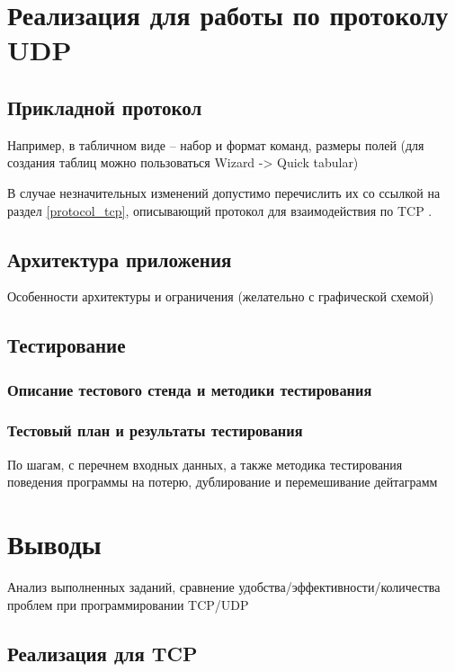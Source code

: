 \documentclass[12pt,a4paper]{report}
\begin{document}
\chapter{Реализация для работы по протоколу UDP}
\section{Прикладной протокол}

Например, в табличном виде -- набор и формат команд, размеры полей
(для создания таблиц можно пользоваться Wizard -> Quick tabular)




В случае незначительных изменений допустимо перечислить их со ссылкой на раздел \ref{protocol_tcp}, описывающий протокол для взаимодействия по TCP .

\section{Архитектура приложения}
Особенности архитектуры и ограничения (желательно с графической схемой) 

\section{Тестирование}
\subsection{Описание тестового стенда и методики тестирования}
\subsection{Тестовый план и результаты тестирования}
По шагам, с перечнем входных данных,
а также  методика тестирования поведения программы на потерю, дублирование и перемешивание дейтаграмм

\chapter{Выводы}
Анализ выполненных заданий, сравнение удобства/эффективности/количества проблем при программировании TCP/UDP
\section{Реализация для TCP}
\end{document}
